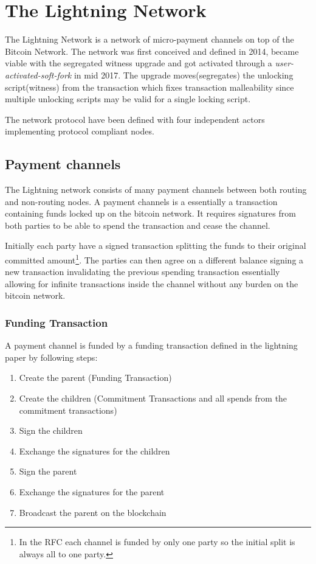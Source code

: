 \chapter{The Lightning Network}
\label{sec:lightning:network}

The Lightning Network is a network of micro-payment channels on top of the Bitcoin Network. The network was first conceived and defined in 2014\cite{poon:dryja:lightning:network}, became viable with the segregated witness upgrade\cite{bip:0141:segwit} and got activated through a \textit{user-activated-soft-fork} in mid 2017\cite{bip:148:uasf:segwit}. The upgrade moves(segregates) the unlocking script(witness) from the transaction which fixes transaction malleability since multiple unlocking scripts may be valid for a single locking script. 

The network protocol have been defined\cite{repository:lightning:rfc} with four independent actors implementing protocol compliant nodes\cite{repository:lnd}\cite{repository:eclair}\cite{repository:clightning}\cite{repository:lit}.

\section{Payment channels}

The Lightning network consists of many payment channels between both routing and non-routing nodes.
A payment channels is a essentially a transaction containing funds locked up on the bitcoin network. It requires signatures from both parties to be able to spend the transaction and cease the channel.

Initially each party have a signed transaction splitting the funds to their original committed amount\footnote{In the RFC each channel is funded by only one party so the initial split is always all to one party.}. The parties can then agree on a different balance signing a new transaction invalidating the previous spending transaction essentially allowing for infinite transactions inside the channel without any burden on the bitcoin network.

\subsection{Funding Transaction}

A payment channel is funded by a funding transaction defined in the lightning paper by following steps\cite{poon:dryja:lightning:network}:

\begin{enumerate}
	\item  Create the parent (Funding Transaction)
	\item  Create the children (Commitment Transactions and all spends from the commitment transactions)
	\item  Sign the children
	\item  Exchange the signatures for the children
	\item  Sign the parent
	\item  Exchange the signatures for the parent
	\item  Broadcast the parent on the blockchain
\end{enumerate}

